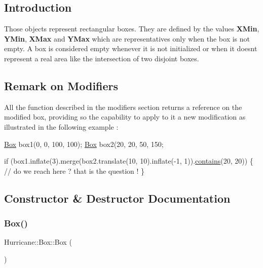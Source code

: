 \hypertarget{classHurricane_1_1Box_secBoxIntro}{}\subsection{Introduction}\label{classHurricane_1_1Box_secBoxIntro}
Those objects represent rectangular boxes. They are defined by the values {\bfseries X\+Min}, {\bfseries Y\+Min}, {\bfseries X\+Max} and {\bfseries Y\+Max} which are representatives only when the box is not empty. A box is considered empty whenever it is not initialized or when it doesn\textquotesingle{}t represent a real area like the intersection of two disjoint boxes.\hypertarget{classHurricane_1_1Box_secBoxModifierRemark}{}\subsection{Remark on Modifiers}\label{classHurricane_1_1Box_secBoxModifierRemark}
All the function described in the modifiers section returns a reference on the modified box, providing so the capability to apply to it a new modification as illustrated in the following example \+: 
\begin{DoxyCode}
\hyperlink{classHurricane_1_1Box_a445dd24bf83759bb47fc483fc7da024f}{Box} box1(0, 0, 100, 100);
\hyperlink{classHurricane_1_1Box_a445dd24bf83759bb47fc483fc7da024f}{Box} box2(20, 20, 50, 150;
 
\textcolor{keywordflow}{if} (box1.inflate(3).merge(box2.translate(10, 10).inflate(-1, 1)).\hyperlink{classHurricane_1_1Box_ae18dd30ffbf0b75714ece480f21e2898}{contains}(20, 20)) \{
   \textcolor{comment}{// do we reach here ? that is the question !}
\}
\end{DoxyCode}
 

\subsection{Constructor \& Destructor Documentation}
\mbox{\label{classHurricane_1_1Box_a445dd24bf83759bb47fc483fc7da024f}} 
\subsubsection{\texorpdfstring{Box()}{Box()}\hspace{0.1cm}{\footnotesize\ttfamily [1/6]}}
{\footnotesize\ttfamily Hurricane\+::\+Box\+::\+Box (\begin{DoxyParamCaption}{ }\end{DoxyParamCaption})}

